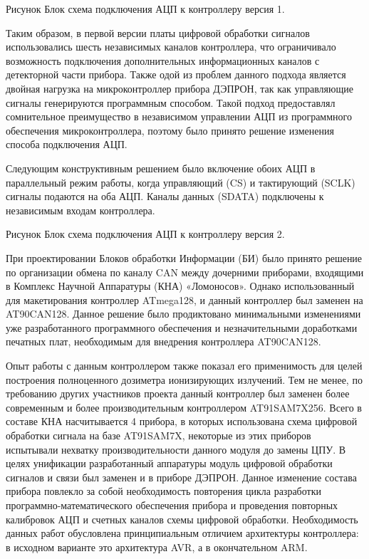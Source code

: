\documentclass[a4paper,portrait,12pt]{article}
\begin{document}
{{{{Рисунок Блок схема подключения АЦП к контроллеру версия 1.


Таким образом, в первой версии платы цифровой обработки сигналов использовались шесть независимых каналов контроллера, что ограничивало возможность подключения дополнительных информационных каналов с детекторной части прибора. Также одой из проблем данного подхода является двойная нагрузка на микроконтроллер прибора ДЭПРОН, так как управляющие сигналы генерируются программным способом. Такой подход предоставлял сомнительное преимущество в независимом управлении АЦП из программного обеспечения микроконтроллера, поэтому было принято решение изменения способа подключения АЦП.


Следующим конструктивным решением было включение обоих АЦП в параллельный режим работы, когда управляющий (CS) и тактирующий (SCLK) сигналы подаются на оба АЦП. Каналы данных (SDATA) подключены к независимым входам контроллера. 





Рисунок Блок схема подключения АЦП к контроллеру версия 2.





При проектировании Блоков обработки Информации (БИ) было принято решение по организации обмена по каналу CAN между дочерними приборами, входящими в Комплекс Научной Аппаратуры (КНА) «Ломоносов». Однако использованный для макетирования контроллер ATmega128, и данный контроллер был заменен на AT90CAN128. Данное решение было продиктовано минимальными изменениями уже разработанного программного обеспечения и незначительными доработками печатных плат, необходимым для внедрения контроллера AT90CAN128.


Опыт работы с данным контроллером также показал его применимость для целей построения полноценного дозиметра ионизирующих излучений. Тем не менее, по требованию других участников проекта данный контроллер был заменен более современным и более производительным контроллером AT91SAM7X256. Всего в составе КНА насчитывается 4 прибора, в которых использована схема цифровой обработки сигнала на базе AT91SAM7X, некоторые из этих приборов испытывали нехватку производительности данного модуля до замены ЦПУ. В целях унификации разработанный аппаратуры модуль цифровой обработки сигналов и связи был заменен и в приборе ДЭПРОН. Данное изменение состава прибора повлекло за собой необходимость повторения цикла разработки программно-математического обеспечения прибора и проведения повторных калибровок АЦП и счетных каналов схемы цифровой обработки. Необходимость данных работ обусловлена принципиальным отличием архитектуры контроллера: в исходном варианте это архитектура AVR, а в окончательном ARM. 


}}}}
\end{document}
